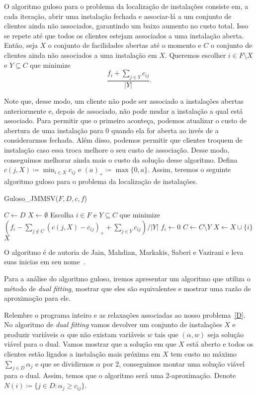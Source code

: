 O algoritmo guloso para o problema da localização de instalações consiste em, a cada iteração, abrir uma instalação fechada e associar-lá a um conjunto de clientes ainda não associados, garantindo um baixo aumento no custo total. 
Isso se repete até que todos os clientes estejam associados a uma instalação aberta. Então, seja $X$ o conjunto de facilidades abertas até o momento e $C$ o conjunto de clientes ainda não associados a uma instalação em $X$. Queremos escolher $i \in F \setminus X$ e $Y \subseteq C$ que minimize
\[ \frac{f_i + \sum_{j \in Y} c_{ij}}{|Y|}.
    \] 

Note que, desse modo, um cliente não pode ser associado a instalações abertas anteriormente e, depois de associado, não pode mudar a instalação a qual está associado. 
Para permitir que o primeiro aconteça, podemos atualizar o custo de abertura de uma instalação para 0 quando ela for aberta ao invés de a considerarmos fechada. Além disso, podemos permitir que clientes troquem de instalação caso essa troca melhore o seu custo de associação. Desse modo, conseguimos melhorar ainda mais o custo da solução desse algoritmo. Defina $c(j,X) \coloneqq \min_{i \in X} c_{ij}$ e $(a)_+ \coloneqq \max\{0,a\}$. Assim, teremos o seguinte algoritmo guloso para o problema da localização de instalações.
\begin{algorithm}
    \caption{Guloso\_JMMSV($F,D,c,f$)}
    \begin{algorithmic}[1]
        \State $C \gets D$
        \State $X \gets \emptyset$
        \State Escolha $i \in F$ e $Y \subseteq C$ que minimize $(f_i - \sum_{j \not \in C}(c(j,X) - c_{ij})_+ + \sum_{j \in Y}c_{ij})/|Y|$
        \State $f_i \gets 0$
        \State $C \gets C \setminus Y$
        \State $X \gets X \cup \{i\}$
        \EndWhile
        \State \Return $X$
    \end{algorithmic}
\end{algorithm}

O algoritmo é de autoria de Jain, Mahdian, Markakis, Saberi e Vazirani e leva suas inicias em seu nome~\cite{jain2002greedy}.

Para a análise do algoritmo guloso, iremos apresentar um algoritmo que utiliza o método de \emph{dual fitting}, mostrar que eles são equivalentes e mostrar uma razão de aproximação para ele.

Relembre o programa inteiro e as relaxações associadas ao nosso problema~\ref{D}. 
No algoritmo de \emph{dual fitting} vamos devolver um conjunto de instalações $X$ e produzir variáveis $\alpha$ que não existam variáveis $w$ tais que $(\alpha,w)$ seja solução viável para o dual. 
Vamos mostrar que a solução em que $X$ está aberto e todos os clientes estão ligados a instalação mais próxima em $X$ tem custo no máximo $\sum_{j \in D} \alpha_j$ e que se dividirmos $\alpha$ por 2, conseguimos montar uma solução viável para o dual. 
Assim, temos que o algoritmo será uma 2-aproximação. 
Denote $N(i) \coloneqq \{j \in D: \alpha_j \geq c_{ij}\}$.

